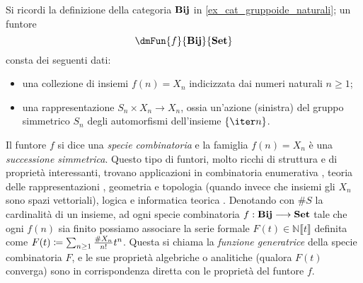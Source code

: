 \begin{example}
	Si ricordi la definizione della categoria \(\mathbf{Bij}\) in \ref{ex_cat_gruppoide_naturali}; un funtore
	\[\dmFun{f}{\cate{Bij}}{\ctSet}\]
	consta dei seguenti dati:
	\begin{itemize}
		\item una collezione di insiemi \(f(n)=X_n\) indicizzata dai numeri naturali \(n\ge 1\);
		\item una rappresentazione \(S_n \times X_n\to X_n\), ossia un'azione (sinistra) del gruppo simmetrico \(S_n\) degli automorfismi dell'insieme \(\{\iter n\}\).
	\end{itemize}
	Il funtore \(f\) si dice una \emph{specie combinatoria} e la famiglia \(f(n)=X_n\) è una \emph{successione simmetrica}. Questo tipo di funtori, molto ricchi di struttura e di proprietà interessanti, trovano applicazioni in combinatoria enumerativa \cite{bergeron1998combinatorial}, teoria delle rappresentazioni \cite{aguiar2010monoidal}, geometria e topologia \cite{} (quando invece che insiemi gli \(X_n\) sono spazi vettoriali), logica e informatica teorica \cite{}. Denotando con \(\# S\) la cardinalità di un insieme, ad ogni specie combinatoria \(f : \mathbf{Bij} \longrightarrow\mathbf{Set}\) tale che ogni \(f(n)\) sia finito possiamo associare la serie formale \(F(t)\in\mathbb{N}\llbracket t\rrbracket\) definita come \(F(t) \coloneqq \sum_{n\ge 1} \frac{\# X_n}{n!}t^n\). Questa si chiama la \emph{funzione generatrice} della specie combinatoria \(F\), e le sue proprietà algebriche o analitiche (qualora \(F(t)\) converga) sono in corrispondenza diretta con le proprietà del funtore \(f\).
\end{example}

